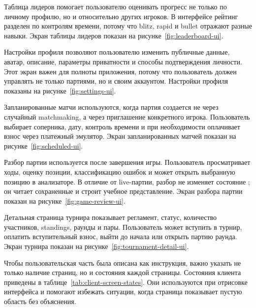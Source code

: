 Таблица лидеров помогает пользователю оценивать прогресс не только по личному профилю, но и относительно других игроков. В интерфейсе рейтинг разделен по контролям времени, потому что blitz, rapid и bullet отражают разные навыки. Экран таблицы лидеров показан на рисунке~\ref{fig:leaderboard-ui}.


Настройки профиля позволяют пользователю изменить публичные данные, аватар, описание, параметры приватности и способы подтверждения личности. Этот экран важен для полноты приложения, потому что пользователь должен управлять не только партиями, но и своим аккаунтом. Настройки профиля показаны на рисунке~\ref{fig:settings-ui}.


Запланированные матчи используются, когда партия создается не через случайный matchmaking, а через приглашение конкретного игрока. Пользователь выбирает соперника, дату, контроль времени и при необходимости оплачивает взнос через платежный эмулятор. Экран запланированных матчей показан на рисунке~\ref{fig:scheduled-ui}.


Разбор партии используется после завершения игры. Пользователь просматривает ходы, оценку позиции, классификацию ошибок и может открыть выбранную позицию в анализаторе. В отличие от live-партии, разбор не изменяет состояние ; он читает сохраненные  и строит учебное представление. Экран разбора партии показан на рисунке~\ref{fig:game-review-ui}.


Детальная страница турнира показывает регламент, статус, количество участников, standings, раунды и пары. Пользователь может вступить в турнир, оплатить вступительный взнос, выйти до начала или открыть партию раунда. Экран турнира показан на рисунке~\ref{fig:tournament-detail-ui}.


Чтобы пользовательская часть была описана как инструкция, важно указать не только наличие страниц, но и состояния каждой страницы. Состояния клиента приведены в таблице~\ref{tab:client-screen-states}. Они используются при отрисовке интерфейса и помогают избежать ситуации, когда страница показывает пустую область без объяснения.


